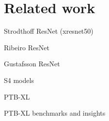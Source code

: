 \documentclass[journal,twoside,web]{ieeecolor}
\begin{document}





% 

\section{Related work}
Strodthoff ResNet (xresnet50) \cite{mehari2022}

Ribeiro ResNet \cite{ribeiro2020}

Gustafsson ResNet \cite{gustafsson2022}

S4 models \cite{mehari2023}

PTB-XL \cite{wagner2020}

PTB-XL benchmarks and insights \cite{strodthoff2020}


\end{document}
